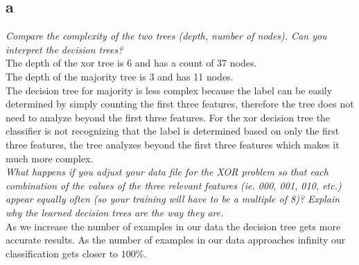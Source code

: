 \documentclass{article}
\begin{document}
\subsection*{a}
\textit{Compare the complexity of the two trees (depth, number of nodes). Can you interpret the decision trees?}\\
The depth of the xor tree is 6 and has a count of 37 nodes.\\
The depth of the majority tree is 3 and has 11 nodes.\\
The decision tree for majority is less complex because the label can be easily determined by simply counting the first three features, therefore the tree does not need to analyze beyond the first three features. For the xor decision tree the classifier is not recognizing that the label is determined based on only the first three features, the tree analyzes beyond the first three features which makes it much more complex. \\
 \textit{What happens if you adjust your data file for the XOR problem so that each combination of the values of the three relevant features (ie. 000, 001, 010, etc.) appear equally often (so your training will have to be a multiple of 8)? Explain why the learned decision trees are the way they are.}\\
As we increase the number of examples in our data the decision tree gets more accurate results. As the number of examples in our data approaches infinity our classification gets closer to $100\%$.\\
\end{document}
